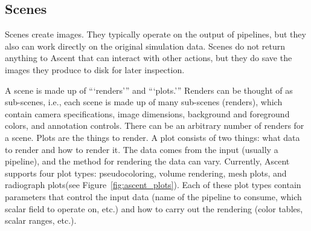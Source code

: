 \subsection{Scenes}

Scenes create images.
%
They typically operate on the output of pipelines, but they also can work directly
on the original simulation data.
%
Scenes do not return anything to Ascent that can interact with other actions, but they
do save the images they produce to disk for later inspection.

A scene is made up of ```renders''' and ```plots.'''
%
Renders can be thought of as sub-scenes, i.e., each scene is made up of many sub-scenes (renders),
which contain
camera specifications, image dimensions, background and
foreground colors, and annotation controls.
%
There can be an arbitrary number of renders for a scene. 
%
Plots are the things to render.
%
A plot consists of two things: what data to render and how to render it.
%
The data comes from the input (usually a pipeline), and the method for rendering the data can vary.
%
Currently, Ascent supports four plot types: pseudocoloring, volume rendering, mesh plots,
and radiograph plots(see Figure~\ref{fig:ascent_plots}).
%
Each of these plot types contain parameters that control the input data
(name of the pipeline to consume, which scalar field to operate on, etc.)
and how to carry out the rendering (color tables, scalar ranges, etc.).
%

